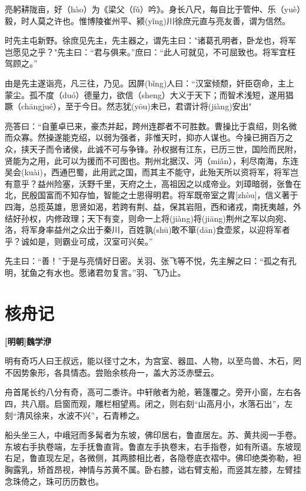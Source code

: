 \documentclass[UTF8,titlepage,oneside]{ctexbook}
\begin{document}
亮躬耕陇亩，好（hào）为《梁父（fǔ）吟》。身长八尺，每自比于管仲、乐（yuè）毅，时人莫之许也。惟博陵崔州平、颍(yǐng)川徐庶元直与亮友善，谓为信然。


时先主屯新野。徐庶见先主，先主器之，谓先主曰："诸葛孔明者，卧龙也，将军岂愿见之乎？"先主曰：“君与俱来。”庶曰：“此人可就见，不可屈致也。将军宜枉驾顾之。”


由是先主遂诣亮，凡三往，乃见。因屏(bǐng)人曰：“汉室倾颓，奸臣窃命，主上蒙尘。孤不度（duó）德量力，欲信（sheng）大义于天下；而智术浅短，遂用猖蹶（chāngjué），至于今日。然志犹(yōu)未已，君谓计将(jiàng)安出"


亮答曰：“自董卓已来，豪杰并起，跨州连郡者不可胜数。曹操比于袁绍，则名微而众寡。然操遂能克绍，以弱为强者，非惟天时，抑亦人谋也。今操已拥百万之众，挟天子而令诸侯，此诚不可与争锋。孙权据有江东，已历三世，国险而民附，贤能为之用，此可以为援而不可图也。荆州北据汉、沔（miǎn），利尽南海，东连吴会(kuài)，西通巴蜀，此用武之国，而其主不能守，此殆天所以资将军，将军岂有意乎？益州险塞，沃野千里，天府之土，高祖因之以成帝业。刘璋暗弱，张鲁在北，民殷国富而不知存恤，智能之士思得明君。将军既帝室之胄[zhòu]，信义著于四海，总揽英雄，思贤如渴，若跨有荆、益，保其岩阻，西和诸戎，南抚夷越，外结好孙权，内修政理；天下有变，则命一上将(jiàng)将(jiāng)荆州之军以向宛、洛，将军身率益州之众出于秦川，百姓孰(shū)敢不箪(dān)食壶浆，以迎将军者乎？诚如是，则霸业可成，汉室可兴矣。”


先主曰：“善！”于是与亮情好日密。关羽、张飞等不悦，先主解之曰：“孤之有孔明，犹鱼之有水也。愿诸君勿复言。”羽、飞乃止。



\chapter*{核舟记}
\begin{center}
	\textbf{[明朝]魏学洢}
\end{center}

明有奇巧人曰王叔远，能以径寸之木，为宫室、器皿、人物，以至鸟兽、木石，罔不因势象形，各具情态。尝贻余核舟一，盖大苏泛赤壁云。


舟首尾长约八分有奇，高可二黍许。中轩敞者为舱，箬篷覆之。旁开小窗，左右各四，共八扇。启窗而观，雕栏相望焉。闭之，则右刻“山高月小，水落石出”，左刻“清风徐来，水波不兴”，石青糁之。


船头坐三人，中峨冠而多髯者为东坡，佛印居右，鲁直居左。苏、黄共阅一手卷。东坡右手执卷端，左手抚鲁直背。鲁直左手执卷末，右手指卷，如有所语。东坡现右足，鲁直现左足，各微侧，其两膝相比者，各隐卷底衣褶中。佛印绝类弥勒，袒胸露乳，矫首昂视，神情与苏黄不属。卧右膝，诎右臂支船，而竖其左膝，左臂挂念珠倚之，珠可历历数也。
\end{document}
